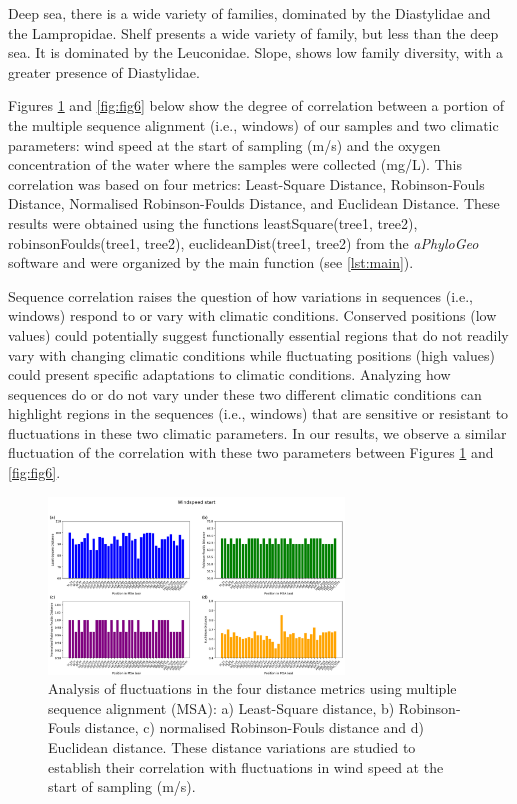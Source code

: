 Deep sea, there is a wide variety of families, dominated by the Diastylidae and the Lampropidae. Shelf presents a wide variety of family, but less than the deep sea. It is dominated by the Leuconidae. Slope, shows low family diversity, with a greater presence of Diastylidae. 

Figures \ref{fig:fig5} and \ref{fig:fig6} below show the degree of correlation between a portion of the multiple sequence alignment (i.e., windows) of our samples and two climatic parameters: wind speed at the start of sampling (m/s) and the oxygen concentration of the water where the samples were collected (mg/L). This correlation was based on four metrics: Least-Square Distance, Robinson-Fouls Distance, Normalised Robinson-Foulds Distance, and Euclidean Distance. These results were obtained using the functions leastSquare(tree1, tree2), robinsonFoulds(tree1, tree2), euclideanDist(tree1, tree2) from the \textit{aPhyloGeo} software and were organized by the main function (see \autoref{lst:main}). 

Sequence correlation raises the question of how variations in sequences (i.e., windows) respond to or vary with climatic conditions. Conserved positions (low values) could potentially suggest functionally essential regions that do not readily vary with changing climatic conditions while fluctuating positions (high values) could present specific adaptations to climatic conditions. Analyzing how sequences do or do not vary under these two different climatic conditions can highlight regions in the sequences (i.e., windows) that are sensitive or resistant to fluctuations in these two climatic parameters. In our results, we observe a similar fluctuation of the correlation with these two parameters between Figures \ref{fig:fig5} and \ref{fig:fig6}.

\begin{figure}[]
    \centering
    \includegraphics[width=0.7\textwidth]{figure5.png}
    \caption{Analysis of fluctuations in the four distance metrics using multiple sequence alignment (MSA): a) Least-Square distance, b) Robinson-Fouls distance, c) normalised Robinson-Fouls distance and d) Euclidean distance. These distance variations are studied to establish their correlation with fluctuations in wind speed at the start of sampling (m/s). \label{fig:fig5}}
\end{figure}

